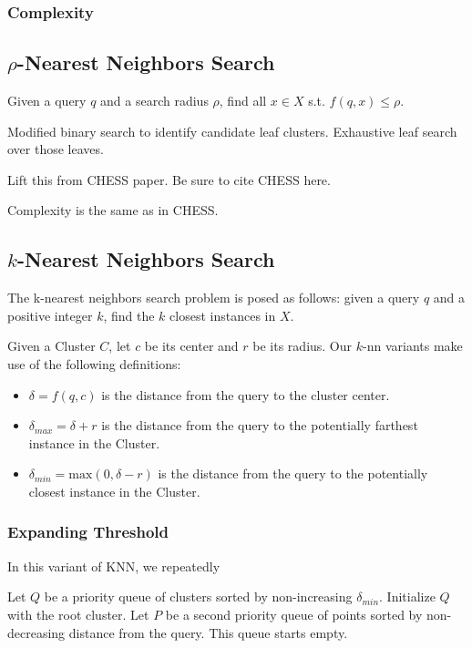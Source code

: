 \subsubsection {Complexity}

\subsection{\texorpdfstring{$\rho$}{p}-Nearest Neighbors Search}
\label{subsec:methods:rnn-search}

Given a query $q$ and a search radius $\rho$, find all $x \in X$ s.t. $f(q, x) \leq \rho$.

Modified binary search to identify candidate leaf clusters.
Exhaustive leaf search over those leaves.

Lift this from CHESS paper. Be sure to cite CHESS here.

Complexity is the same as in CHESS.

\subsection{\texorpdfstring{$k$}{k}-Nearest Neighbors Search}
\label{subsec:methods:knn-search}

The k-nearest neighbors search problem is posed as follows: given a query $q$ and a positive integer $k$, find the $k$ closest instances in $X$.

Given a Cluster $C$, let $c$ be its center and $r$ be its radius. Our $k$-nn variants make use of the following definitions:
\begin{itemize}
    \item $\delta = f(q, c)$ is the distance from the query to the cluster center.
    \item $\delta_{max} = \delta + r$ is the distance from the query to the potentially farthest instance in the Cluster.
    \item $\delta_{min} = \text{max}(0, \delta - r)$ is the distance from the query to the potentially closest instance in the Cluster.
\end{itemize}

\subsubsection{Expanding Threshold}
\label{subsubsec:methods:knn-search:expanding-threshold}
In this variant of KNN, we repeatedly  

Let $Q$ be a priority queue of clusters sorted by non-increasing $\delta_{min}$. Initialize $Q$ with the root cluster.
Let $P$ be a second priority queue of points sorted by non-decreasing distance from the query. This queue starts empty.

